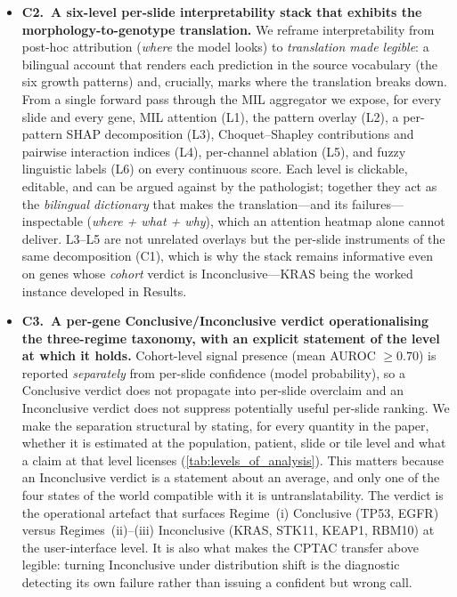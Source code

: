 \begin{itemize}
    \item \textbf{C2.\ A six-level per-slide interpretability stack
    that exhibits the morphology-to-genotype translation.}
    We reframe interpretability from post-hoc attribution
    (\emph{where} the model looks) to \emph{translation made
    legible}: a bilingual account that renders each prediction in
    the source vocabulary (the six growth patterns) and, crucially,
    marks where the translation breaks down.
    From a single forward pass through the MIL aggregator we expose,
    for every slide and every gene, MIL attention (L1), the pattern
    overlay (L2), a per-pattern SHAP
    decomposition (L3),\cite{lundberg2017shap} Choquet--Shapley
    contributions and pairwise interaction indices (L4), per-channel
    ablation (L5), and fuzzy linguistic labels (L6) on every
    continuous score.
    Each level is clickable, editable, and can be argued against by
    the pathologist; together they act as the \emph{bilingual
    dictionary} that makes the translation---and its
    failures---inspectable (\emph{where + what + why}), which an
    attention heatmap alone cannot deliver.
    L3--L5 are not unrelated overlays but the per-slide instruments
    of the same decomposition (C1), which is why the stack remains
    informative even on genes whose \emph{cohort} verdict is
    Inconclusive---KRAS being the worked instance developed in
    Results.

    \item \textbf{C3.\ A per-gene Conclusive/Inconclusive verdict
    operationalising the three-regime taxonomy, with an explicit
    statement of the level at which it holds.}
    Cohort-level signal presence (mean AUROC $\geq 0.70$) is
    reported \emph{separately} from per-slide confidence (model
    probability), so a Conclusive verdict does not propagate into
    per-slide overclaim and an Inconclusive verdict does not suppress
    potentially useful per-slide ranking.
    We make the separation structural by stating, for every quantity
    in the paper, whether it is estimated at the population, patient,
    slide or tile level and what a claim at that level licenses
    (\cref{tab:levels_of_analysis}).
    This matters because an Inconclusive verdict is a statement about
    an average, and only one of the four states of the world
    compatible with it is untranslatability.
    The verdict is the operational artefact that surfaces Regime~(i)
    Conclusive (TP53, EGFR) versus Regimes~(ii)--(iii) Inconclusive
    (KRAS, STK11, KEAP1, RBM10) at the user-interface level.
    It is also what makes the CPTAC transfer above legible: turning
    Inconclusive under distribution shift is the diagnostic detecting
    its own failure rather than issuing a confident but wrong call.


\end{itemize}
